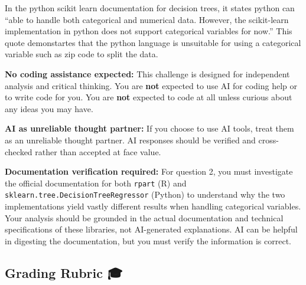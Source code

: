 \documentclass[
  letterpaper,
  DIV=11,
  numbers=noendperiod]{scrartcl}
\begin{document}
In the python scikit learn documentation for decision trees, it states
python can ``able to handle both categorical and numerical data.
However, the scikit-learn implementation in python does not support
categorical variables for now.'' This quote demonstartes that the python
language is unsuitable for using a categorical variable such as zip code
to split the data.

\begin{tcolorbox}[enhanced jigsaw, bottomtitle=1mm, coltitle=black, rightrule=.15mm, colbacktitle=quarto-callout-important-color!10!white, opacityback=0, colback=white, toptitle=1mm, title=\textcolor{quarto-callout-important-color}{\faExclamation}\hspace{0.5em}{📋 Important Note on AI Usage}, titlerule=0mm, left=2mm, arc=.35mm, colframe=quarto-callout-important-color-frame, leftrule=.75mm, bottomrule=.15mm, toprule=.15mm, opacitybacktitle=0.6, breakable]

\textbf{No coding assistance expected:} This challenge is designed for
independent analysis and critical thinking. You are \textbf{not}
expected to use AI for coding help or to write code for you. You are
\textbf{not} expected to code at all unless curious about any ideas you
may have.

\textbf{AI as unreliable thought partner:} If you choose to use AI
tools, treat them as an unreliable thought partner. AI responses should
be verified and cross-checked rather than accepted at face value.

\textbf{Documentation verification required:} For question 2, you must
investigate the official documentation for both \texttt{rpart} (R) and
\texttt{sklearn.tree.DecisionTreeRegressor} (Python) to understand why
the two implementations yield vastly different results when handling
categorical variables. Your analysis should be grounded in the actual
documentation and technical specifications of these libraries, not
AI-generated explanations. AI can be helpful in digesting the
documentation, but you must verify the information is correct.

\end{tcolorbox}

\subsection{Grading Rubric 🎓}\label{grading-rubric}
\end{document}
